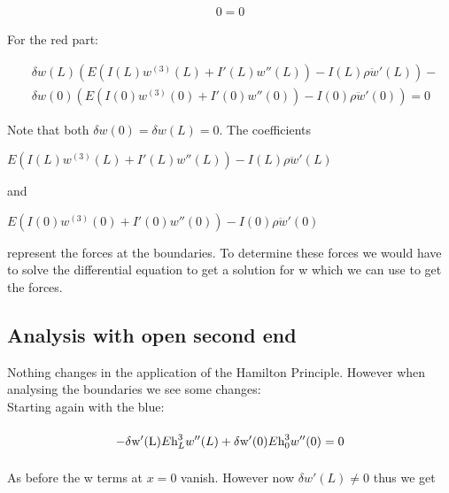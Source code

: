 \begin{equation}
    \begin{split}
        0 = 0
    \end{split}
\end{equation}

For the red part:

\begin{equation}
    \begin{split}
        &\delta w(L) \left(E\left(I(L)w^{(3)}(L) + I'(L)w''(L)\right) - I(L)\rho \ddot w'(L)\right) - \\
        &\delta w(0) \left(E\left(I(0)w^{(3)}(0) + I'(0)w''(0)\right) - I(0)\rho \ddot w'(0)\right) = 0
    \end{split}
\end{equation}

Note that both $\delta w(0) = \delta w(L) = 0$. The coefficients
\begin{center}
    $E\left(I(L)w^{(3)}(L) + I'(L)w''(L)\right) - I(L)\rho \ddot w'(L)$
\end{center}
 
and 

\begin{center}
    $E\left(I(0)w^{(3)}(0) + I'(0)w''(0)\right) - I(0)\rho \ddot w'(0)$
\end{center}

represent the forces at the boundaries. To determine these forces we would have to solve the differential equation to get a solution for w which we can use to get the forces.

\subsection{Analysis with open second end}

Nothing changes in the application of the Hamilton Principle. However when analysing the boundaries we see some changes:\\
\vspace{5mm}
\noindent Starting again with the blue:

\begin{equation}
    \begin{split}
        -\mathrm{\delta w'(L)}E\text{h}_L^3w''(L) + \mathrm{\delta w'(0)}\vphantom{\int}E\text{h}_0^3w''(0) = 0
    \end{split}
\end{equation}

As before the w terms at $x = 0$ vanish. However now $\delta w'(L) \neq 0$ thus we get 

